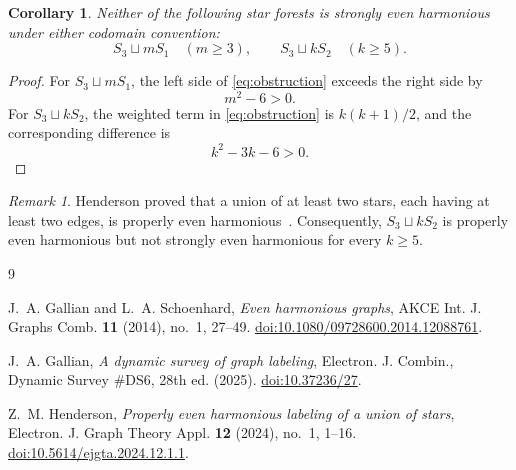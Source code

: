 \documentclass[11pt]{amsart}
\newtheorem{corollary}[theorem]{Corollary}
\theoremstyle{remark}
\newtheorem{remark}[theorem]{Remark}
\begin{document}
\begin{corollary}\label{cor:families}
Neither of the following star forests is strongly even harmonious
under either codomain convention:
\[
 S_3\sqcup mS_1 \quad (m\ge3),
 \qquad
 S_3\sqcup kS_2 \quad (k\ge5).
\]
\end{corollary}

\begin{proof}
For $S_3\sqcup mS_1$, the left side of
\eqref{eq:obstruction} exceeds the right side by
\[
 m^2-6>0.
\]
For $S_3\sqcup kS_2$, the weighted term in
\eqref{eq:obstruction} is $k(k+1)/2$, and the corresponding difference
is
\[
 k^2-3k-6>0.
\]
\end{proof}

\begin{remark}
Henderson proved that a union of at least two stars, each having at
least two edges, is properly even
harmonious~\cite[Theorem~3.1]{Henderson}. Consequently,
$S_3\sqcup kS_2$ is properly even harmonious but not strongly even
harmonious for every $k\ge5$.
\end{remark}

\begin{thebibliography}{9}

J.~A. Gallian and L.~A. Schoenhard,
\emph{Even harmonious graphs},
AKCE Int. J. Graphs Comb. \textbf{11} (2014), no.~1, 27--49.
\href{https://doi.org/10.1080/09728600.2014.12088761}
{doi:10.1080/09728600.2014.12088761}.

J.~A. Gallian,
\emph{A dynamic survey of graph labeling},
Electron. J. Combin., Dynamic Survey \#DS6,
28th ed. (2025).
\href{https://doi.org/10.37236/27}
{doi:10.37236/27}.

Z.~M. Henderson,
\emph{Properly even harmonious labeling of a union of stars},
Electron. J. Graph Theory Appl. \textbf{12} (2024),
no.~1, 1--16.
\href{https://doi.org/10.5614/ejgta.2024.12.1.1}
{doi:10.5614/ejgta.2024.12.1.1}.

\end{thebibliography}
\end{document}
